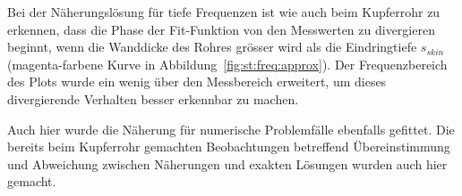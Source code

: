 {	\begin{minipage}[t]{0.33\textwidth}
        \vspace{0pt}
        Bei der N\"aherungsl\"osung  f\"ur tiefe Frequenzen ist  wie auch beim
        Kupferrohr  zu  erkennen, dass  die  Phase  der Fit-Funktion  von  den
        Messwerten  zu  divergieren  beginnt, wenn die  Wanddicke  des  Rohres
        gr\"osser  wird  als  die  Eindringtiefe  $s_{skin}$  (magenta-farbene
        Kurve in  Abbildung~\ref{fig:st:freq:approx}). Der Frequenzbereich des
        Plots  wurde ein  wenig \"uber  den Messbereich  erweitert, um  dieses
        divergierende Verhalten besser erkennbar zu machen.
        \vspace{1em}
        
	\end{minipage}%
	\begin{minipage}[t]{0.67\textwidth}
        \vspace{0pt}
        \resizebox{.95\textwidth}{!}{}
        \label{fig:st:freq:approx}
	\end{minipage}


	\begin{minipage}[t]{0.33\textwidth}
        \vspace{0pt}
        Auch  hier  wurde  die   N\"aherung  f\"ur  numerische  Problemf\"alle
        ebenfalls    gefittet. Die   bereits    beim   Kupferrohr    gemachten
        Beobachtungen  betreffend  \"Ubereinstimmung und  Abweichung  zwischen
        N\"aherungen und exakten L\"osungen wurden auch hier gemacht.
        
	\end{minipage}%
	\begin{minipage}[t]{0.67\textwidth}
        \vspace{0pt}
        \resizebox{.95\textwidth}{!}{}
        \label{fig:st:freq:approx2}
	\end{minipage}


}
